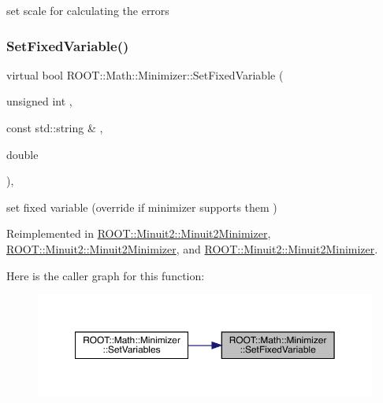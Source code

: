 set scale for calculating the errors 

\mbox{\label{classROOT_1_1Math_1_1Minimizer_a063e9d83c8a61afc8798ebb1d74b6f2b}} 
\subsubsection{\texorpdfstring{SetFixedVariable()}{SetFixedVariable()}\hspace{0.1cm}{\footnotesize\ttfamily [1/3]}}
{\footnotesize\ttfamily virtual bool R\+O\+O\+T\+::\+Math\+::\+Minimizer\+::\+Set\+Fixed\+Variable (\begin{DoxyParamCaption}\item[{unsigned int}]{,  }\item[{const std\+::string \&}]{,  }\item[{double}]{ }\end{DoxyParamCaption})\hspace{0.3cm}{\ttfamily [inline]}, {\ttfamily [virtual]}}



set fixed variable (override if minimizer supports them ) 



Reimplemented in \mbox{\hyperlink{classROOT_1_1Minuit2_1_1Minuit2Minimizer_af42341b80ebb02d8c0882beaa781e7bd}{R\+O\+O\+T\+::\+Minuit2\+::\+Minuit2\+Minimizer}}, \mbox{\hyperlink{classROOT_1_1Minuit2_1_1Minuit2Minimizer_af42341b80ebb02d8c0882beaa781e7bd}{R\+O\+O\+T\+::\+Minuit2\+::\+Minuit2\+Minimizer}}, and \mbox{\hyperlink{classROOT_1_1Minuit2_1_1Minuit2Minimizer_af42341b80ebb02d8c0882beaa781e7bd}{R\+O\+O\+T\+::\+Minuit2\+::\+Minuit2\+Minimizer}}.

Here is the caller graph for this function\+:
\nopagebreak
\begin{figure}[H]
\begin{center}
\leavevmode
\includegraphics[width=350pt]{dc/dc4/classROOT_1_1Math_1_1Minimizer_a063e9d83c8a61afc8798ebb1d74b6f2b_icgraph}
\end{center}
\end{figure}
\mbox{\label{classROOT_1_1Math_1_1Minimizer_a063e9d83c8a61afc8798ebb1d74b6f2b}} 
